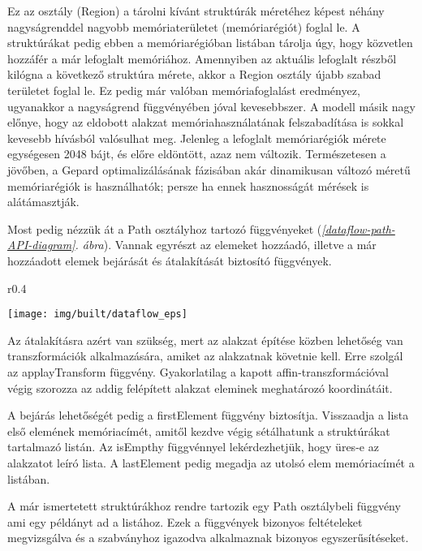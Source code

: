 \documentclass[12pt]{report}
\theoremstyle{definition}
\newcommand{\func}[1]{{\textsf{\footnotesize{#1}}}}
\newcommand{\melyikoldalra}{r}
\begin{document}
Ez az osztály (\func{Region}) a tárolni kívánt struktúrák méretéhez képest
néhány nagyságrenddel nagyobb memóriaterületet (memóriarégiót) foglal le. A
struktúrákat pedig ebben a memóriarégióban listában tárolja úgy, hogy közvetlen
hozzáfér a már lefoglalt memóriához. Amennyiben az aktuális lefoglalt részből
kilógna a következő struktúra mérete, akkor a \func{Region} osztály újabb
szabad területet foglal le. Ez pedig már valóban memóriafoglalást eredményez,
ugyanakkor a nagyságrend függvényében jóval kevesebbszer. A modell másik nagy
előnye, hogy az eldobott alakzat memóriahasználatának felszabadítása is sokkal
kevesebb hívásból valósulhat meg. Jelenleg a lefoglalt memóriarégiók mérete
egységesen 2048 bájt, és előre eldöntött, azaz nem változik. Természetesen a
jövőben, a Gepard optimalizálásának fázisában akár dinamikusan változó méretű
memóriarégiók is használhatók; persze ha ennek hasznosságát mérések is
alátámasztják.

Most pedig nézzük át a \func{Path} osztályhoz tartozó függvényeket
(\emph{\ref{dataflow-path-API-diagram}. ábra}). Vannak egyrészt az elemeket hozzáadó,
illetve a már hozzáadott elemek bejárását és átalakítását biztosító függvények.

  \begin{wrapfigure}{\melyikoldalra}{0.4\textwidth}
    \begin{center}
      \texttt{[image: img/built/dataflow\_eps]}
    \end{center}
    \caption{\label{dataflow-path-API-diagram} A belső Path API részei}
  \end{wrapfigure}

Az átalakításra azért van szükség, mert az alakzat építése közben lehetőség van
transzformációk alkalmazására, amiket az alakzatnak követnie kell. Erre szolgál
az \func{applayTransform} függvény. Gyakorlatilag a kapott
affin-transzformációval végig szorozza az addig felépített alakzat eleminek
meghatározó koordinátáit.

A bejárás lehetőségét pedig a \func{firstElement} függvény biztosítja.
Visszaadja a lista első elemének memóriacímét, amitől kezdve végig sétálhatunk
a struktúrákat tartalmazó listán. Az \func{isEmpthy} függvénnyel
lekérdezhetjük, hogy üres-e az alakzatot leíró lista. A \func{lastElement}
pedig megadja az utolsó elem memóriacímét a listában.

A már ismertetett struktúrákhoz rendre tartozik egy \func{Path} osztálybeli
függvény ami egy példányt ad a listához. Ezek a függvények bizonyos
feltételeket megvizsgálva és a szabványhoz igazodva alkalmaznak bizonyos
egyszerűsítéseket.
\end{document}
